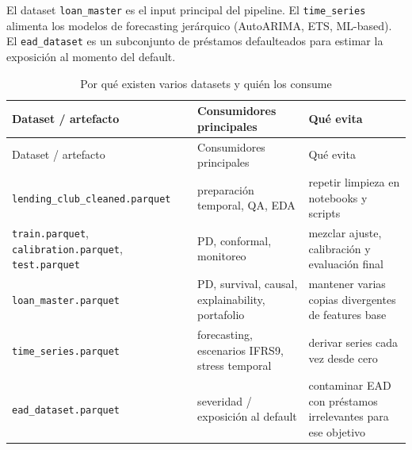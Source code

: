 \documentclass[
  spanish,
  11pt,
  letterpaper,
]{scrbook}
\theoremstyle{plain}
\theoremstyle{remark}
\begin{document}
El dataset \texttt{loan\_master} es el input principal del pipeline. El
\texttt{time\_series} alimenta los modelos de forecasting jerárquico
(AutoARIMA, ETS, ML-based). El \texttt{ead\_dataset} es un subconjunto
de préstamos defaulteados para estimar la exposición al momento del
default.

\begin{longtable}[]{@{}
  >{\raggedright\arraybackslash}p{}
  >{\raggedright\arraybackslash}p{}
  >{\raggedright\arraybackslash}p{}@{}}
\caption{Por qué existen varios datasets y quién los
consume}\label{tbl-dataset-consumers}\tabularnewline
\toprule\noalign{}
\begin{minipage}[b]{\linewidth}\raggedright
Dataset / artefacto
\end{minipage} & \begin{minipage}[b]{\linewidth}\raggedright
Consumidores principales
\end{minipage} & \begin{minipage}[b]{\linewidth}\raggedright
Qué evita
\end{minipage} \\
\midrule\noalign{}
\endfirsthead
\toprule\noalign{}
\begin{minipage}[b]{\linewidth}\raggedright
Dataset / artefacto
\end{minipage} & \begin{minipage}[b]{\linewidth}\raggedright
Consumidores principales
\end{minipage} & \begin{minipage}[b]{\linewidth}\raggedright
Qué evita
\end{minipage} \\
\midrule\noalign{}
\endhead
\bottomrule\noalign{}
\endlastfoot
\texttt{lending\_club\_cleaned.parquet} & preparación temporal, QA, EDA
& repetir limpieza en notebooks y scripts \\
\texttt{train.parquet}, \texttt{calibration.parquet},
\texttt{test.parquet} & PD, conformal, monitoreo & mezclar ajuste,
calibración y evaluación final \\
\texttt{loan\_master.parquet} & PD, survival, causal, explainability,
portafolio & mantener varias copias divergentes de features base \\
\texttt{time\_series.parquet} & forecasting, escenarios IFRS9, stress
temporal & derivar series cada vez desde cero \\
\texttt{ead\_dataset.parquet} & severidad / exposición al default &
contaminar EAD con préstamos irrelevantes para ese objetivo \\
\end{longtable}
\end{document}
